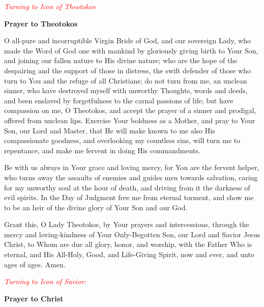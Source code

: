 \textcolor{red}{\textit{Turning to Icon of Theotokos}}

\begin{center}
\textbf{Prayer to Theotokos}
\end{center} 

\begin{hang}
\noindent{}O all-pure and incorruptible Virgin Bride 
of God, and our sovereign Lady, who made the Word of God one with mankind by 
gloriously giving birth to Your Son, and joining our fallen nature to His 
divine nature; who are the hope of the despairing and the support of those in 
distress, the swift defender of those who turn to You and the refuge of all 
Christians; do not turn from me, an unclean sinner, who have destroyed myself 
with unworthy Thoughts, words and deeds, and been enslaved by forgetfulness to 
the carnal passions of life; but have compassion on me, O Theotokos, and accept 
the prayer of a sinner and prodigal, offered from unclean lips.  Exercise Your 
boldness as a Mother, and pray to Your Son, our Lord and Master, that He will 
make known to me also His compassionate goodness, and overlooking my countless 
sins, will turn me to repentance, and make me fervent in doing His commandments.

Be with us always in Your grace and loving mercy, for You are the fervent 
helper, who turns away the assaults of enemies and guides men towards 
salvation, caring for my unworthy soul at the hour of death, and driving from 
it the darkness of evil spirits.  In the Day of Judgment free me from eternal 
torment, and show me to be an heir of the divine glory of Your Son and our God.

Grant this, O Lady Theotokos, by Your prayers and intercessions, through the 
mercy and loving-kindness of Your Only-Begotten Son, our Lord and Savior Jesus 
Christ, to Whom are due all glory, honor, and worship, with the Father Who is 
eternal, and His All-Holy, Good, and Life-Giving Spirit, now and ever, and unto 
ages of ages.  Amen.

\end{hang}

\textcolor{red}{\textit{Turning to Icon of Savior:}}

\begin{center}
\textbf{Prayer to Christ}
\end{center}


